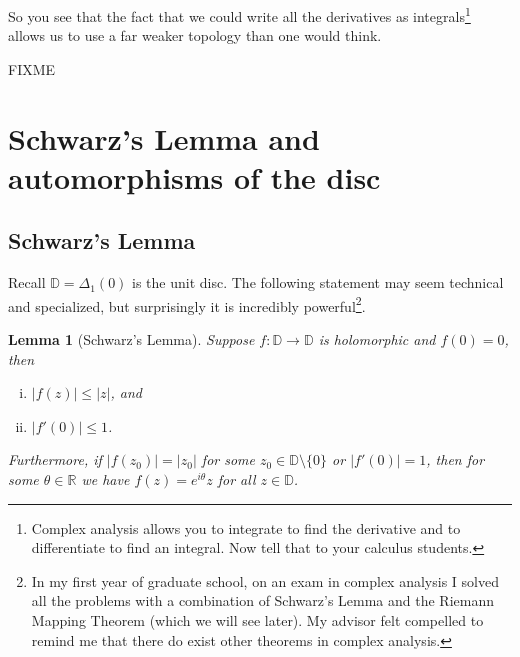 \documentclass[12pt,openany]{book}
\newcommand{\sabs}[1]{\lvert {#1} \rvert}
\newcommand{\R}{{\mathbb{R}}}
\newcommand{\D}{{\mathbb{D}}}
\theoremstyle{plain}
\newtheorem{lemma}[thm]{Lemma}
\theoremstyle{remark}
\theoremstyle{definition}
\theoremstyle{exercise}
\theoremstyle{example}
\begin{document}
So you see that the fact that we could write all the derivatives as
integrals\footnote{Complex analysis allows you to integrate to find the
derivative and to differentiate to find an integral.  Now tell that to your
calculus students.}
allows us to use a far weaker topology than one would think.

FIXME


\section{Schwarz's Lemma and automorphisms of the disc}
\label{sec:schwarz}

\subsection{Schwarz's Lemma}

Recall $\D = \Delta_1(0)$ is the unit disc.  The following statement may
seem technical and specialized, but surprisingly it is incredibly
powerful\footnote{In my first year of graduate school, on an exam in complex
analysis I solved all the problems with a combination of
Schwarz's Lemma and
the Riemann
Mapping Theorem (which we will see later).  My advisor
felt compelled to remind me that there do exist other theorems in complex
analysis.}.

\begin{lemma}[Schwarz's Lemma]
Suppose $f \colon \D \to \D$ is holomorphic and $f(0) = 0$,
then 
\begin{enumerate}[(i)]
\item $\sabs{f(z)} \leq \sabs{z}$, and
\item $\sabs{f'(0)} \leq 1$.
\end{enumerate}
Furthermore, if $\sabs{f(z_0)} = \sabs{z_0}$ for some $z_0 \in \D \setminus
\{ 0 \}$
or $\sabs{f'(0)} = 1$, then
for some $\theta \in \R$ we have $f(z) =
e^{i\theta} z$ for all $z \in \D$.
\end{lemma}
\end{document}
